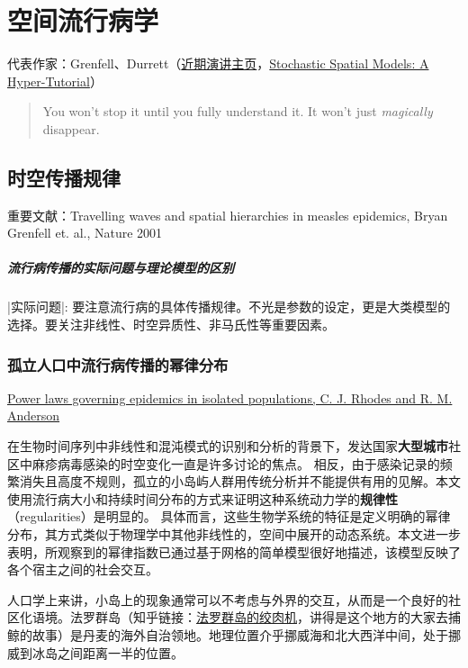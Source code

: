 \chapter{空间流行病学}

代表作家：Grenfell、Durrett（\href{https://services.math.duke.edu/~rtd/Talks/Talks.html}{近期演讲主页}，\href{https://services.math.duke.edu/~rtd/survey/survhome.html}{Stochastic Spatial Models: A Hyper-Tutorial}）

\begin{quote}
    You won't stop it until you fully understand it. It won't just \textit{magically} disappear.
\end{quote}



\section{时空传播规律}
重要文献：Travelling waves and spatial hierarchies in measles epidemics, Bryan Grenfell et. al., Nature 2001

\paragraph{流行病传播的实际问题与理论模型的区别} |实际问题|: 要注意流行病的具体传播规律。不光是参数的设定，更是大类模型的选择。要关注非线性、时空异质性、非马氏性等重要因素。

\subsection{孤立人口中流行病传播的幂律分布}

\href{https://www.nature.com/articles/381600a0}{Power laws governing epidemics in isolated populations, C. J. Rhodes and R. M. Anderson}

在生物时间序列中非线性和混沌模式的识别和分析的背景下，发达国家\textbf{大型城市}社区中麻疹病毒感染的时空变化一直是许多讨论的焦点。 相反，由于感染记录的频繁消失且高度不规则，孤立的小岛屿人群用传统分析并不能提供有用的见解。本文使用流行病大小和持续时间分布的方式来证明这种系统动力学的\textbf{规律性}（regularities）是明显的。 具体而言，这些生物学系统的特征是定义明确的幂律分布，其方式类似于物理学中其他非线性的，空间中展开的动态系统。本文进一步表明，所观察到的幂律指数已通过基于网格的简单模型很好地描述，该模型反映了各个宿主之间的社会交互。

人口学上来讲，小岛上的现象通常可以不考虑与外界的交互，从而是一个良好的社区化语境。法罗群岛（知乎链接：\href{https://zhuanlan.zhihu.com/p/26426579}{法罗群岛的绞肉机}，讲得是这个地方的大家去捕鲸的故事）是丹麦的海外自治领地。地理位置介乎挪威海和北大西洋中间，处于挪威到冰岛之间距离一半的位置。

